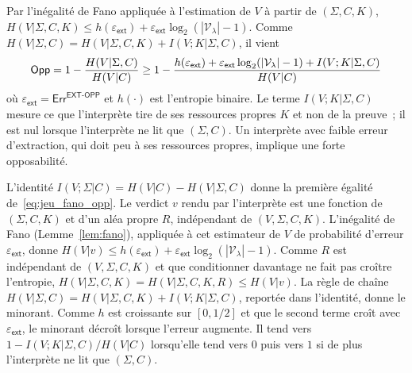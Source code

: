 \begin{sloppypar}
\begin{remark}
\label{rem:jeu_ext_opp_link}
Par l'in\'egalit\'e de Fano appliqu\'ee \`a l'estimation de $V$ \`a partir de
$(\Sigma,C,K)$, $H(V|\Sigma,C,K) \leq h(\varepsilon_{\mathsf{ext}}) +
\varepsilon_{\mathsf{ext}}\log_2(|\mathcal{V}_\lambda|-1)$. Comme
$H(V|\Sigma,C) = H(V|\Sigma,C,K) + I(V;K|\Sigma,C)$, il vient
\begin{equation}
\mathsf{Opp} = 1 - \frac{H(V|\Sigma,C)}{H(V|C)}
\geq 1 - \frac{h(\varepsilon_{\mathsf{ext}})
  + \varepsilon_{\mathsf{ext}}\log_2(|\mathcal{V}_\lambda|-1)
  + I(V;K|\Sigma,C)}
  {H(V|C)}
\label{eq:jeu_fano_opp}
\end{equation}
o\`u $\varepsilon_{\mathsf{ext}} = \mathsf{Err}^{\mathsf{EXT\text{-}OPP}}$
et $h(\cdot)$ est l'entropie binaire. Le terme $I(V;K|\Sigma,C)$ mesure ce que
l'interpr\`ete tire de ses ressources propres $K$ et non de la preuve~; il est nul
lorsque l'interpr\`ete ne lit que $(\Sigma,C)$.
Un interpr\`ete avec faible erreur d'extraction, qui doit peu \`a ses ressources propres,
implique une forte opposabilit\'e.
\end{remark}

\begin{Preuve}
L'identit\'e $I(V;\Sigma|C) = H(V|C) - H(V|\Sigma,C)$ donne la premi\`ere
\'egalit\'e de~\eqref{eq:jeu_fano_opp}. Le verdict $v$ rendu par l'interpr\`ete est
une fonction de $(\Sigma,C,K)$ et d'un al\'ea propre $R$, ind\'ependant de
$(V,\Sigma,C,K)$. L'in\'egalit\'e de Fano (Lemme~\ref{lem:fano}), appliqu\'ee \`a cet
estimateur de $V$ de probabilit\'e d'erreur $\varepsilon_{\mathsf{ext}}$, donne
$H(V|v) \leq h(\varepsilon_{\mathsf{ext}}) +
\varepsilon_{\mathsf{ext}}\log_2(|\mathcal{V}_\lambda|-1)$. Comme $R$ est
ind\'ependant de $(V,\Sigma,C,K)$ et que conditionner davantage ne fait pas cro\^itre
l'entropie, $H(V|\Sigma,C,K) = H(V|\Sigma,C,K,R) \leq H(V|v)$. La r\`egle de cha\^ine
$H(V|\Sigma,C) = H(V|\Sigma,C,K) + I(V;K|\Sigma,C)$, report\'ee dans l'identit\'e,
donne le minorant. Comme $h$ est croissante sur $[0,1/2]$ et que le second terme
cro\^it avec $\varepsilon_{\mathsf{ext}}$, le minorant d\'ecro\^it lorsque l'erreur
augmente. Il tend vers $1 - I(V;K|\Sigma,C)/H(V|C)$ lorsqu'elle tend vers $0$
puis vers $1$ si de plus l'interpr\`ete ne lit que $(\Sigma,C)$.
\end{Preuve}

\end{sloppypar}

